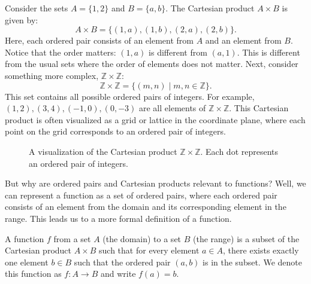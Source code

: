 \begin{example}
    Consider the sets \(A = \{1, 2\}\) and \(B = \{a, b\}\). The Cartesian product \(A \times B\) is given by:
    \begin{equation}
        A \times B = \{(1, a), (1, b), (2, a), (2, b)\}.
    \end{equation}
    Here, each ordered pair consists of an element from \(A\) and an element from \(B\). Notice that the order matters: \((1, a)\) is different from \((a, 1)\). This is different from the usual sets where the order of elements does not matter. Next, consider something more complex, \(\mathbb{Z}\times\mathbb{Z}\):
    \begin{equation}
      \mathbb{Z} \times \mathbb{Z} = \{(m, n) \mid m, n \in \mathbb{Z}\}.
    \end{equation}
    This set contains all possible ordered pairs of integers. For example, \((1, 2), (3, 4), (-1, 0), (0, -3)\) are all elements of \(\mathbb{Z} \times \mathbb{Z}\). This Cartesian product is often visualized as a grid or lattice in the coordinate plane, where each point on the grid corresponds to an ordered pair of integers.
    \begin{figure}[H]
      \centering
      \caption{A visualization of the Cartesian product \(\mathbb{Z} \times \mathbb{Z}\). Each dot represents an ordered pair of integers.}
      \label{cartesianproduct}
    \end{figure}
\end{example}

But why are ordered pairs and Cartesian products relevant to functions? Well, we can represent a function as a set of ordered pairs, where each ordered pair consists of an element from the domain and its corresponding element in the range. This leads us to a more formal definition of a function.
\begin{definition}
  A function \(f\) from a set \(A\) (the domain) to a set \(B\) (the range) is a subset of the Cartesian product \(A \times B\) such that for every element \(a \in A\), there exists exactly one element \(b \in B\) such that the ordered pair \((a,b)\) is in the subset. We denote this function as \(f: A \to B\) and write \(f(a) = b\).
\end{definition}


